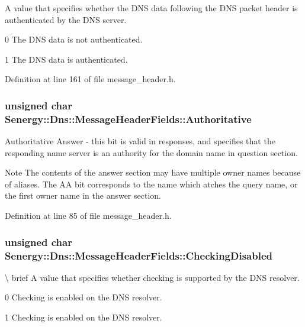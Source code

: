 A value that specifies whether the D\-N\-S data following the D\-N\-S packet header is authenticated by the D\-N\-S server. 

0 The D\-N\-S data is not authenticated.

1 The D\-N\-S data is authenticated. 

Definition at line 161 of file message\-\_\-header.\-h.

\hypertarget{struct_senergy_1_1_dns_1_1_message_header_fields_a706fe34b459a6aaacc28f0249213b013}{
\subsubsection[{Authoritative}]{\setlength{\rightskip}{0pt plus 5cm}unsigned char Senergy\-::\-Dns\-::\-Message\-Header\-Fields\-::\-Authoritative}}\label{struct_senergy_1_1_dns_1_1_message_header_fields_a706fe34b459a6aaacc28f0249213b013}


Authoritative Answer -\/ this bit is valid in responses, and specifies that the responding name server is an authority for the domain name in question section. 

\begin{DoxyNote}{Note}
The contents of the answer section may have multiple owner names because of aliases. The A\-A bit corresponds to the name which atches the query name, or the first owner name in the answer section. 
\end{DoxyNote}


Definition at line 85 of file message\-\_\-header.\-h.

\hypertarget{struct_senergy_1_1_dns_1_1_message_header_fields_a2c846064b4582f46a94bd90b32ef1cd9}{
\subsubsection[{Checking\-Disabled}]{\setlength{\rightskip}{0pt plus 5cm}unsigned char Senergy\-::\-Dns\-::\-Message\-Header\-Fields\-::\-Checking\-Disabled}}\label{struct_senergy_1_1_dns_1_1_message_header_fields_a2c846064b4582f46a94bd90b32ef1cd9}
\textbackslash{} brief A value that specifies whether checking is supported by the D\-N\-S resolver. \begin{DoxyVerb}      0               Checking is enabled on the DNS resolver.

      1               Checking is enabled on the DNS resolver.\end{DoxyVerb}
 


